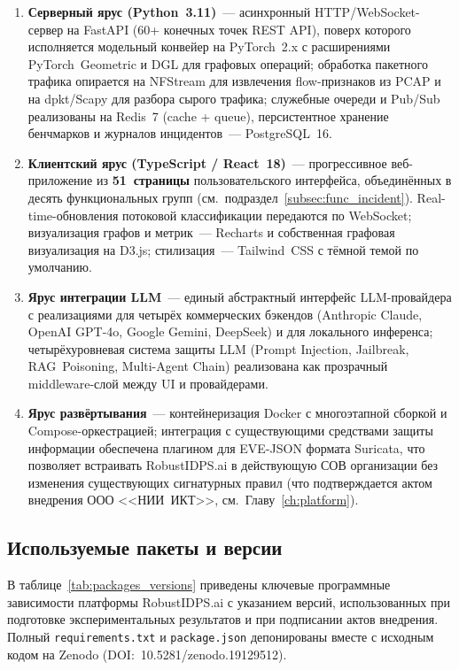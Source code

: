 \begin{enumerate}[leftmargin=2em, itemsep=0pt]
\item \textbf{Серверный ярус (Python~3.11)}~--- асинхронный
HTTP/WebSocket-сервер на FastAPI (60+ конечных точек REST API),
поверх которого исполняется модельный конвейер на PyTorch~2.x с
расширениями PyTorch~Geometric и DGL для графовых операций;
обработка пакетного трафика опирается на NFStream для
извлечения flow-признаков из PCAP и на dpkt/Scapy для разбора
сырого трафика; служебные очереди и Pub/Sub реализованы на
Redis~7 (cache + queue), персистентное хранение бенчмарков и
журналов инцидентов~--- PostgreSQL~16.

\item \textbf{Клиентский ярус (TypeScript / React~18)}~---
прогрессивное веб-приложение из \textbf{51~страницы}
пользовательского интерфейса, объединённых в десять
функциональных групп (см.~подраздел~\ref{subsec:func_incident}).
Real-time-обновления потоковой классификации передаются по
WebSocket; визуализация графов и метрик~--- Recharts и собственная
графовая визуализация на D3.js; стилизация~--- Tailwind~CSS с
тёмной темой по умолчанию.

\item \textbf{Ярус интеграции LLM}~--- единый абстрактный
интерфейс LLM-провайдера с реализациями для четырёх
коммерческих бэкендов (Anthropic Claude, OpenAI GPT-4o,
Google Gemini, DeepSeek) и для локального инференса;
четырёхуровневая система защиты LLM (Prompt Injection,
Jailbreak, RAG~Poisoning, Multi-Agent Chain) реализована как
прозрачный middleware-слой между UI и провайдерами.

\item \textbf{Ярус развёртывания}~--- контейнеризация Docker
с многоэтапной сборкой и Compose-оркестрацией; интеграция с
существующими средствами защиты информации обеспечена
плагином для EVE-JSON формата Suricata, что позволяет
встраивать RobustIDPS.ai в действующую СОВ организации без
изменения существующих сигнатурных правил (что подтверждается
актом внедрения ООО <<НИИ~ИКТ>>, см.~Главу~\ref{ch:platform}).

\end{enumerate}

\subsection{Используемые пакеты и версии}
\label{subsec:packages_versions}

В таблице~\ref{tab:packages_versions} приведены ключевые
программные зависимости платформы RobustIDPS.ai с указанием
версий, использованных при подготовке экспериментальных
результатов и при подписании актов внедрения. Полный
\texttt{requirements.txt} и \texttt{package.json} депонированы
вместе с исходным кодом на Zenodo (DOI:~10.5281/zenodo.19129512).

